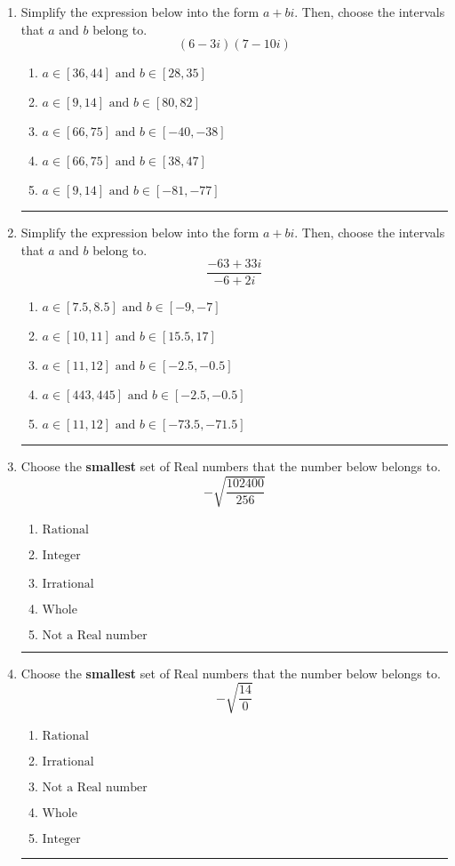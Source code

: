 \documentclass[14pt]{extbook}
\newcommand{\litem}[1]{\item#1\hspace*{-1cm}\rule{\textwidth}{0.4pt}}
\begin{document}
\begin{enumerate}
{\begin{enumerate}[label=\Alph*.]
\end{enumerate} }
\litem{
Simplify the expression below into the form $a+bi$. Then, choose the intervals that $a$ and $b$ belong to.\[ (6 - 3 i)(7 - 10 i) \]\begin{enumerate}[label=\Alph*.]
\item \( a \in [36, 44] \text{ and } b \in [28, 35] \)
\item \( a \in [9, 14] \text{ and } b \in [80, 82] \)
\item \( a \in [66, 75] \text{ and } b \in [-40, -38] \)
\item \( a \in [66, 75] \text{ and } b \in [38, 47] \)
\item \( a \in [9, 14] \text{ and } b \in [-81, -77] \)

\end{enumerate} }
\litem{
Simplify the expression below into the form $a+bi$. Then, choose the intervals that $a$ and $b$ belong to.\[ \frac{-63 + 33 i}{-6 + 2 i} \]\begin{enumerate}[label=\Alph*.]
\item \( a \in [7.5, 8.5] \text{ and } b \in [-9, -7] \)
\item \( a \in [10, 11] \text{ and } b \in [15.5, 17] \)
\item \( a \in [11, 12] \text{ and } b \in [-2.5, -0.5] \)
\item \( a \in [443, 445] \text{ and } b \in [-2.5, -0.5] \)
\item \( a \in [11, 12] \text{ and } b \in [-73.5, -71.5] \)

\end{enumerate} }
\litem{
Choose the \textbf{smallest} set of Real numbers that the number below belongs to.\[ -\sqrt{\frac{102400}{256}} \]\begin{enumerate}[label=\Alph*.]
\item \( \text{Rational} \)
\item \( \text{Integer} \)
\item \( \text{Irrational} \)
\item \( \text{Whole} \)
\item \( \text{Not a Real number} \)

\end{enumerate} }
\litem{
Choose the \textbf{smallest} set of Real numbers that the number below belongs to.\[ -\sqrt{\frac{14}{0}} \]\begin{enumerate}[label=\Alph*.]
\item \( \text{Rational} \)
\item \( \text{Irrational} \)
\item \( \text{Not a Real number} \)
\item \( \text{Whole} \)
\item \( \text{Integer} \)


\end{enumerate}}
\end{enumerate}
\end{document}
